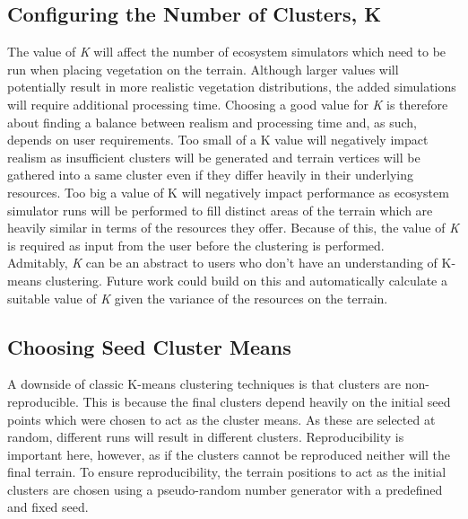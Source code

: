 \subsection{Configuring the Number of Clusters, K} \label{subsec:n_cluster_conf}

The value of \textit{K} will affect the number of ecosystem simulators which need to be run when placing vegetation on the terrain. Although larger values will potentially result in more realistic vegetation distributions, the added simulations will require additional processing time. Choosing a good value for \textit{K} is therefore about finding a balance between realism and processing time and, as such, depends on user requirements. Too small of a K value will negatively impact realism as insufficient clusters will be generated and terrain vertices will be gathered into a same cluster even if they differ heavily in their underlying resources. Too big a value of K will negatively impact performance as ecosystem simulator runs will be performed to fill distinct areas of the terrain which are heavily similar in terms of the resources they offer. Because of this, the value of \textit{K} is required as input from the user before the clustering is performed.\\
Admitably, \textit{K} can be an abstract to users who don't have an understanding of K-means clustering. Future work could build on this and automatically calculate a suitable value of \textit{K} given the variance of the resources on the terrain.\\

\subsection{Choosing Seed Cluster Means} \label{subsec:init_clusters}

A downside of classic K-means clustering techniques is that clusters are non-reproducible. This is because the final clusters depend heavily on the initial seed points which were chosen to act as the cluster means. As these are selected at random, different runs will result in different clusters. Reproducibility is important here, however, as if the clusters cannot be reproduced neither will the final terrain. To ensure reproducibility, the terrain positions to act as the initial clusters are chosen using a pseudo-random number generator with a predefined and fixed seed.
